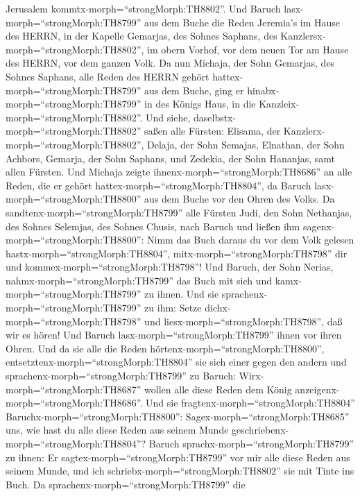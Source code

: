 Jerusalem kommtx-morph=``strongMorph:TH8802''.  Und Baruch
lasx-morph=``strongMorph:TH8799'' aus dem Buche die Reden Jeremia's im
Hause des HERRN, in der Kapelle Gemarjas, des Sohnes Saphans, des
Kanzlersx-morph=``strongMorph:TH8802'', im obern Vorhof, vor dem neuen
Tor am Hause des HERRN, vor dem ganzen Volk.  Da nun
Michaja, der Sohn Gemarjas, des Sohnes Saphans, alle Reden des HERRN
gehört hattex-morph=``strongMorph:TH8799'' aus dem Buche, 
ging er hinabx-morph=``strongMorph:TH8799'' in des Königs Haus, in die
Kanzleix-morph=``strongMorph:TH8802''. Und siehe,
daselbstx-morph=``strongMorph:TH8802'' saßen alle Fürsten: Elisama, der
Kanzlerx-morph=``strongMorph:TH8802'', Delaja, der Sohn Semajas,
Elnathan, der Sohn Achbors, Gemarja, der Sohn Saphans, und Zedekia, der
Sohn Hananjas, samt allen Fürsten.  Und Michaja zeigte
ihnenx-morph=``strongMorph:TH8686'' an alle Reden, die er gehört
hattex-morph=``strongMorph:TH8804'', da Baruch
lasx-morph=``strongMorph:TH8800'' aus dem Buche vor den Ohren des Volks.
 Da sandtenx-morph=``strongMorph:TH8799'' alle Fürsten
Judi, den Sohn Nethanjas, des Sohnes Selemjas, des Sohnes Chusis, nach
Baruch und ließen ihm sagenx-morph=``strongMorph:TH8800'': Nimm das Buch
daraus du vor dem Volk gelesen hastx-morph=``strongMorph:TH8804'',
mitx-morph=``strongMorph:TH8798'' dir und
kommex-morph=``strongMorph:TH8798''! Und Baruch, der Sohn Nerias,
nahmx-morph=``strongMorph:TH8799'' das Buch mit sich und
kamx-morph=``strongMorph:TH8799'' zu ihnen.  Und sie
sprachenx-morph=``strongMorph:TH8799'' zu ihm: Setze
dichx-morph=``strongMorph:TH8798'' und
liesx-morph=``strongMorph:TH8798'', daß wir es hören! Und Baruch
lasx-morph=``strongMorph:TH8799'' ihnen vor ihren Ohren. 
Und da sie alle die Reden hörtenx-morph=``strongMorph:TH8800'',
entsetztenx-morph=``strongMorph:TH8804'' sie sich einer gegen den andern
und sprachenx-morph=``strongMorph:TH8799'' zu Baruch:
Wirx-morph=``strongMorph:TH8687'' wollen alle diese Reden dem König
anzeigenx-morph=``strongMorph:TH8686''.  Und sie
fragtenx-morph=``strongMorph:TH8804''
Baruchx-morph=``strongMorph:TH8800'': Sagex-morph=``strongMorph:TH8685''
uns, wie hast du alle diese Reden aus seinem Munde
geschriebenx-morph=``strongMorph:TH8804''?  Baruch
sprachx-morph=``strongMorph:TH8799'' zu ihnen: Er
sagtex-morph=``strongMorph:TH8799'' vor mir alle diese Reden aus seinem
Munde, und ich schriebx-morph=``strongMorph:TH8802'' sie mit Tinte ins
Buch.  Da sprachenx-morph=``strongMorph:TH8799'' die
